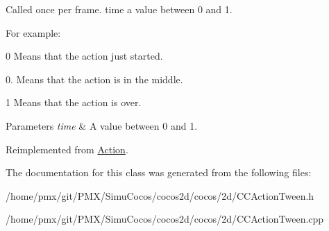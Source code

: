 Called once per frame. time a value between 0 and 1.

For example\+:
\begin{DoxyItemize}
\item 0 Means that the action just started.
\item 0. Means that the action is in the middle.
\item 1 Means that the action is over.
\end{DoxyItemize}


\begin{DoxyParams}{Parameters}
{\em time} & A value between 0 and 1. \\
\hline
\end{DoxyParams}


Reimplemented from \hyperlink{classAction_a937e646e63915e33ad05ba149bfcf239}{Action}.



The documentation for this class was generated from the following files\+:\begin{DoxyCompactItemize}
\item 
/home/pmx/git/\+P\+M\+X/\+Simu\+Cocos/cocos2d/cocos/2d/C\+C\+Action\+Tween.\+h\item 
/home/pmx/git/\+P\+M\+X/\+Simu\+Cocos/cocos2d/cocos/2d/C\+C\+Action\+Tween.\+cpp\end{DoxyCompactItemize}

